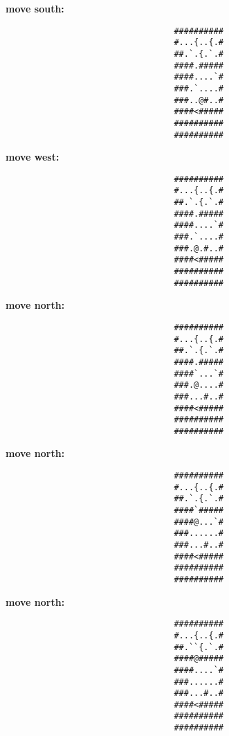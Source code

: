 \begin{MyGreenBox}[frametitle={\textbf{Iteration 2 MiniHack Prompt}}]
{\textbf{move south:}
\begin{verbatim}
                                  ##########
                                  #...{..{.#
                                  ##.`.{.`.#
                                  ####.#####
                                  ####....`#
                                  ###.`....#
                                  ###..@#..#
                                  ####<#####
                                  ##########
                                  ##########
\end{verbatim}

\textbf{move west:}
\begin{verbatim}
                                  ##########
                                  #...{..{.#
                                  ##.`.{.`.#
                                  ####.#####
                                  ####....`#
                                  ###.`....#
                                  ###.@.#..#
                                  ####<#####
                                  ##########
                                  ##########
\end{verbatim}

\textbf{move north:}
\begin{verbatim}
                                  ##########
                                  #...{..{.#
                                  ##.`.{.`.#
                                  ####.#####
                                  ####`...`#
                                  ###.@....#
                                  ###...#..#
                                  ####<#####
                                  ##########
                                  ##########
\end{verbatim}

\textbf{move north:}
\begin{verbatim}
                                  ##########
                                  #...{..{.#
                                  ##.`.{.`.#
                                  ####`#####
                                  ####@...`#
                                  ###......#
                                  ###...#..#
                                  ####<#####
                                  ##########
                                  ##########
\end{verbatim}

\textbf{move north:}
\begin{verbatim}
                                  ##########
                                  #...{..{.#
                                  ##.``{.`.#
                                  ####@#####
                                  ####....`#
                                  ###......#
                                  ###...#..#
                                  ####<#####
                                  ##########
                                  ##########
\end{verbatim}

}
\end{MyGreenBox}
